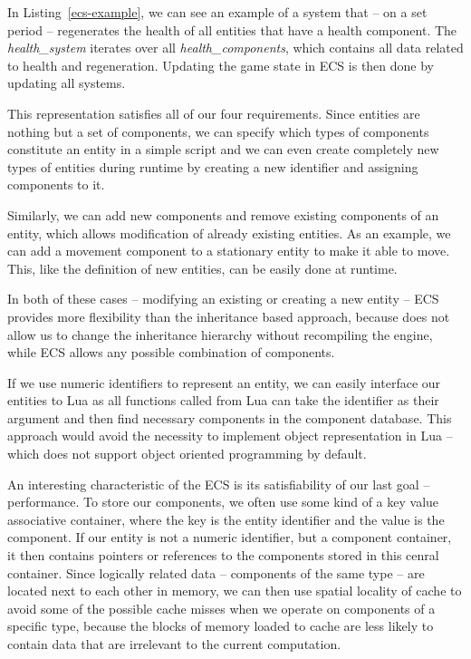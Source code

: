In Listing~\ref{ecs-example}, we can see an example of a system that -- on a set period -- regenerates the health of all entities
that have a health component. The \emph{health\_system} iterates over all \emph{health\_components}, which contains all
data related to health and regeneration. Updating the game state in ECS is then done by updating all systems.

This representation satisfies all of our four requirements. Since entities are nothing but a set of components, we can specify
which types of components constitute an entity in a simple script and we can even create completely new types of entities
during runtime by creating a new identifier and assigning components to it.

Similarly, we can add new components and remove existing components of an entity, which allows modification of already existing
entities. As an example, we can add a movement component to a stationary entity to make it able to move. This, like the definition
of new entities, can be easily done at runtime.

In both of these cases -- modifying an existing or creating a new entity -- ECS provides more flexibility than the inheritance
based approach, because \cpp does not allow us to change the inheritance hierarchy without recompiling the engine, while
ECS allows any possible combination of components.

If we use numeric identifiers to represent an entity, we can easily interface our entities to Lua as all \cpp functions
called from Lua can take the identifier as their argument and then find necessary components in the component database.
This approach would avoid the necessity to implement object representation in Lua -- which does not support object oriented
programming by default.

An interesting characteristic of the ECS is its satisfiability of our last goal -- performance. To store our components,
we often use some kind of a key value associative container, where the key is the entity identifier and the value is the component.
If our entity is not a numeric identifier, but a component container, it then contains pointers or references to the components
stored in this cenral container. Since logically related data -- components of the same type -- are located next to each other
in memory, we can then use spatial locality of cache to avoid some of the possible cache misses when we operate on components of a specific
type, because the blocks of memory loaded to cache are less likely to contain data that are irrelevant to the current computation.

